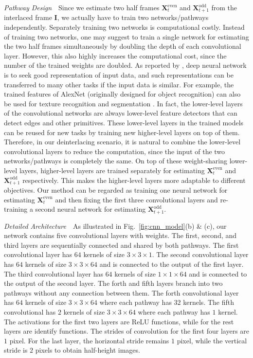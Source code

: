 \documentclass[acmtog]{acmart}
\begin{document}
\vspace{0.15in}
\noindent\emph{Pathway Design}\,\,\,\,
Since we estimate two half frames $\mathbf{X}^{\text{even}}_t$ and
$\mathbf{X}^{\text{odd}}_{t+1}$ from the interlaced frame $\mathbf{I}$, we
actually have to train two networks/pathways independently. Separately training two
networks is computational costly. Instead of training two networks, one
may suggest to train a single network for estimating the two half frames simultaneously
by doubling the depth of each convolutional layer. However, this also
highly increases the computational cost, since the number of the trained weights
are doubled. As reported by \cite{bengio2012deep}, deep neural network is to
seek good representation of input data, and such representations can be transferred
to many other tasks if the input data is similar. For example, the trained
features of AlexNet \cite{krizhevsky2012imagenet} (originally designed for
object recognition) can also be used for texture recognition and segmentation
\cite{cimpoi2015deep}. In fact, the lower-level layers of the convolutional
networks are always lower-level feature detectors that can detect edges and other
primitives. These lower-level layers in the trained models can be reused for new
tasks by training new higher-level layers on top of them. Therefore, in our
deinterlacing scenario, it is natural to combine the lower-level convolutional
layers to reduce the computation, since the input of the two networks/pathways is
completely the same. On top of these weight-sharing lower-level layers, higher-level 
layers are trained separately for estimating $\mathbf{X}^{\text{even}}_t$
and $\mathbf{X}^{\text{odd}}_{t+1}$ respectively. This makes the 
higher-level layers more adaptable to different objectives. Our method can be regarded
as training one neural network for estimating $\mathbf{X}^{\text{even}}_t$ and
then fixing the first three convolutional layers and re-training a second neural
network for estimating $\mathbf{X}^{\text{odd}}_{t+1}$.



\vspace{0.15in}
\noindent\emph{Detailed Architecture}\,\,\,\,
As illustrated in Fig.~\ref{fig:cnn_model}(b) \& (c), our network contains five convolutional layers with weights.
The first, second, and third layers are sequentially connected and shared by both pathways.
The first convolutional layer has $64$ kernels of size $3\times3\times1$.
The second convolutional layer has $64$ kernels of size $3\times3\times64$ and is connected to the output of the first layer.
The third convolutional layer has $64$ kernels of size $1\times1\times64$ and is connected to the output of the second layer.
The forth and fifth layers branch into two pathways without any connection between them.
The forth convolutional layer has $64$ kernels of size $3\times3\times64$ where each pathway has $32$ kernels.
The fifth convolutional has $2$ kernels of size $3\times3\times64$ where each pathway has $1$ kernel.
The activations for the first two layers are ReLU functions, while for the rest layers are identify functions.
The strides of convolution for the first four layers are $1$ pixel.
For the last layer, the horizontal stride remains $1$ pixel, while the vertical stride is $2$ pixels to obtain half-height images.
\end{document}

